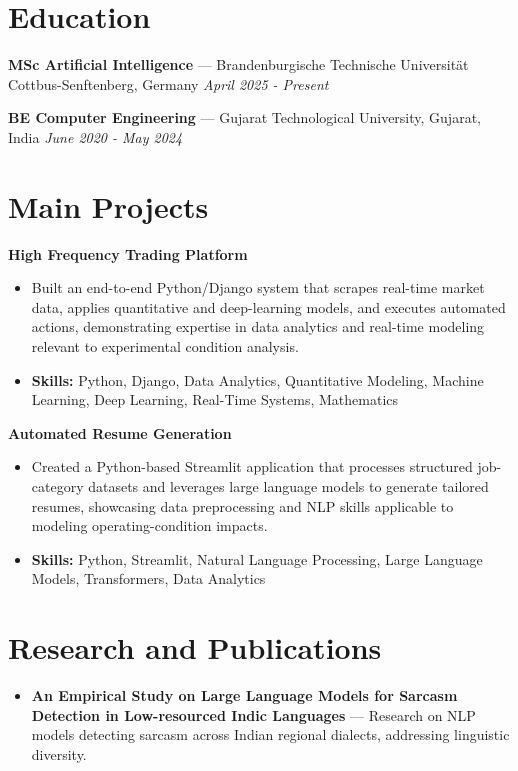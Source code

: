 \documentclass[a4paper,10pt]{article}
\begin{document}
\section*{Education}
\textbf{MSc Artificial Intelligence} — Brandenburgische Technische Universität Cottbus-Senftenberg, Germany \hfill \textit{April 2025 - Present}\par
\vspace{1.5pt}
\textbf{BE Computer Engineering} — Gujarat Technological University, Gujarat, India \hfill \textit{June 2020 - May 2024}\par

\section*{Main Projects}
\textbf{High Frequency Trading Platform}\par
\vspace{1pt}
\begin{itemize}
  \item Built an end-to-end Python/Django system that scrapes real-time market data, applies quantitative and deep-learning models, and executes automated actions, demonstrating expertise in data analytics and real-time modeling relevant to experimental condition analysis.
  \item \textbf{Skills:} Python, Django, Data Analytics, Quantitative Modeling, Machine Learning, Deep Learning, Real-Time Systems, Mathematics
\end{itemize}
\vspace{3pt}
\textbf{Automated Resume Generation}\par
\vspace{1pt}
\begin{itemize}
  \item Created a Python-based Streamlit application that processes structured job-category datasets and leverages large language models to generate tailored resumes, showcasing data preprocessing and NLP skills applicable to modeling operating-condition impacts.
  \item \textbf{Skills:} Python, Streamlit, Natural Language Processing, Large Language Models, Transformers, Data Analytics
\end{itemize}

\section*{Research and Publications}
\begin{itemize}
\item \textbf{An Empirical Study on Large Language Models for Sarcasm Detection in Low-resourced Indic Languages} — Research on NLP models detecting sarcasm across Indian regional dialects, addressing linguistic diversity.
\end{itemize}
\end{document}

